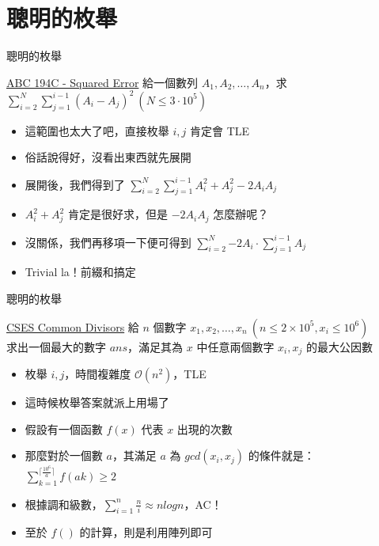 \documentclass[aspectratio=169]{beamer}
\begin{document}
    \section{聰明的枚舉}

    \begin{frame}{聰明的枚舉}
        \begin{block}{\href{https://atcoder.jp/contests/abc194/tasks/abc194_c}{ABC 194C - Squared Error}}
            給一個數列 $A_1, A_2, \dots, A_n$，求 $\displaystyle\sum_{i = 2}^{N}{\sum_{j = 1}^{i - 1}{(A_i - A_j) ^ 2}}\ (N \le 3 \cdot 10^5)$
        \end{block}

        \begin{itemize}
            \item<1-> 這範圍也太大了吧，直接枚舉 $i, j$ 肯定會 TLE
            \item<2-> 俗話說得好，沒看出東西就先展開
            \item<3-> 展開後，我們得到了 $\displaystyle\sum_{i = 2}^{N}{\sum_{j = 1}^{i - 1}{A_i ^ 2 + A_j ^ 2 - 2A_iA_j}}$
            \item<4-> $A_i ^ 2 + A_j ^ 2$ 肯定是很好求，但是 $-2A_iA_j$ 怎麼辦呢？
            \item<5-> 沒關係，我們再移項一下便可得到 $\displaystyle\sum_{i = 2}^{N}{-2A_i \cdot \sum_{j = 1}^{i - 1}{A_j}}$
            \item<6-> Trivial la！前綴和搞定
        \end{itemize}
    \end{frame}

    \begin{frame}{聰明的枚舉}
        \begin{block}{\href{https://cses.fi/problemset/task/1081}{CSES Common Divisors}}
            給 $n$ 個數字 $x_1, x_2, \dots , x_n\ (n \le 2 \times 10^5, x_i \le 10^6)$\\
            求出一個最大的數字 $ans$，滿足其為 $x$ 中任意兩個數字 $x_i, x_j$ 的最大公因數
        \end{block}

        \begin{itemize}
            \item<1-> 枚舉 $i, j$，時間複雜度 $\mathcal{O}(n^2)$，TLE
            \item<2-> 這時候枚舉答案就派上用場了
            \item<3-> 假設有一個函數 $f(x)$ 代表 $x$ 出現的次數
            \item<3-> 那麼對於一個數 $a$，其滿足 $a$ 為 $gcd(x_i, x_j)$ 的條件就是：
            $\displaystyle\sum_{k = 1}^{\lceil \frac{10^6}{a} \rceil}{f(ak)} \ge 2$
            \item<4-> 根據調和級數，$\displaystyle\sum_{i = 1}^{n}{\frac{n}{i}} \approx nlogn$，AC！
            \item<5-> 至於 $f()$ 的計算，則是利用陣列即可
        \end{itemize}
    \end{frame}
\end{document}
